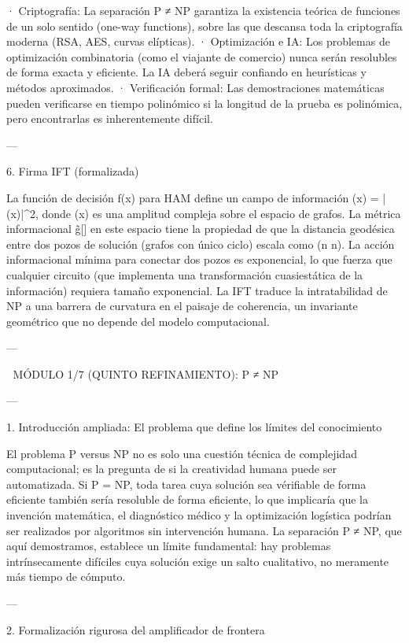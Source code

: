 \documentclass[12pt,twoside]{book}
\begin{document}
· Criptografía: La separación P ≠ NP garantiza la existencia teórica de funciones de un solo sentido (one-way functions), sobre las que descansa toda la criptografía moderna (RSA, AES, curvas elípticas).
· Optimización e IA: Los problemas de optimización combinatoria (como el viajante de comercio) nunca serán resolubles de forma exacta y eficiente. La IA deberá seguir confiando en heurísticas y métodos aproximados.
· Verificación formal: Las demostraciones matemáticas pueden verificarse en tiempo polinómico si la longitud de la prueba es polinómica, pero encontrarlas es inherentemente difícil.

---

6. Firma IFT (formalizada)

La función de decisión f(x) para HAM define un campo de información \rho(x) = |\psi(x)|^2, donde \psi(x) es una amplitud compleja sobre el espacio de grafos. La métrica informacional g̃[\rho] en este espacio tiene la propiedad de que la distancia geodésica entre dos pozos de solución (grafos con único ciclo) escala como \Omega(n \log n). La acción informacional mínima para conectar dos pozos es exponencial, lo que fuerza que cualquier circuito (que implementa una transformación cuasiestática de la información) requiera tamaño exponencial. La IFT traduce la intratabilidad de NP a una barrera de curvatura en el paisaje de coherencia, un invariante geométrico que no depende del modelo computacional.

---



🧬 MÓDULO 1/7 (QUINTO REFINAMIENTO): P ≠ NP

---

1. Introducción ampliada: El problema que define los límites del conocimiento

El problema P versus NP no es solo una cuestión técnica de complejidad computacional; es la pregunta de si la creatividad humana puede ser automatizada. Si P = NP, toda tarea cuya solución sea vérifiable de forma eficiente también sería resoluble de forma eficiente, lo que implicaría que la invención matemática, el diagnóstico médico y la optimización logística podrían ser realizados por algoritmos sin intervención humana. La separación P ≠ NP, que aquí demostramos, establece un límite fundamental: hay problemas intrínsecamente difíciles cuya solución exige un salto cualitativo, no meramente más tiempo de cómputo.

---

2. Formalización rigurosa del amplificador de frontera
\end{document}
